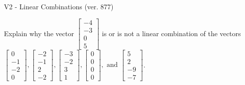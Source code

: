 \begin{exercise}
  \begin{exerciseTitle}V2 - Linear Combinations (ver. 877)\end{exerciseTitle}
  \begin{exerciseStatement}
    Explain why the vector \(\left[\begin{array}{c}
-4 \\
-3 \\
0 \\
5
\end{array}\right]\)  is or is not a linear 
	combination of the vectors \(\left[\begin{array}{c}
0 \\
-1 \\
-2 \\
0
\end{array}\right] , \left[\begin{array}{c}
-2 \\
-1 \\
2 \\
-2
\end{array}\right] , \left[\begin{array}{c}
-3 \\
-2 \\
3 \\
1
\end{array}\right] , \left[\begin{array}{c}
0 \\
0 \\
0 \\
0
\end{array}\right] , \text{ and } \left[\begin{array}{c}
5 \\
2 \\
-9 \\
-7
\end{array}\right]\).
	



\end{exerciseStatement}
\end{exercise}
